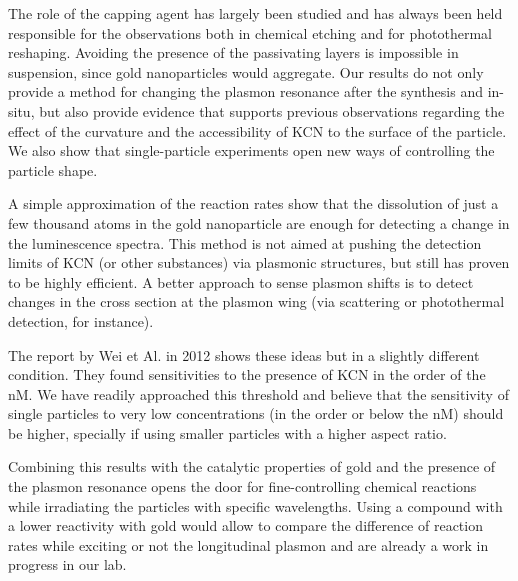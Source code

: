 \documentclass{article}
\begin{document}
The role of the capping agent has largely been studied and has always been held
responsible for the observations both in chemical etching\cite{Yuan2015} and for
photothermal reshaping\cite{Horiguchi2008}. Avoiding the presence of the
passivating layers is impossible in suspension, since gold nanoparticles would
aggregate. Our results do not only provide a method for changing the plasmon
resonance after the synthesis and in-situ, but also provide evidence that
supports previous observations regarding the effect of the curvature and the
accessibility of KCN to the surface of the particle. We also show that
single-particle experiments open new ways of controlling the particle shape.

A simple approximation of the reaction rates show that the dissolution of just a
few thousand atoms in the gold nanoparticle are enough for detecting a change in the
luminescence spectra. This method is not aimed at pushing the detection limits
of KCN (or other substances) via plasmonic structures, but still has proven to
be highly efficient. A better approach to sense plasmon shifts is to detect
changes in the cross section at the plasmon wing (via scattering or
photothermal detection, for instance). 

The report by Wei et Al. in 2012 \cite{Wei2012} shows these ideas but in a
slightly different condition. They found sensitivities to the presence of KCN in
the order of the nM. We have readily approached this threshold and believe that
the sensitivity of single particles to very low concentrations (in the order or
below the nM) should be higher, specially if using smaller particles with a
higher aspect ratio.

Combining this results with the catalytic properties of gold and the presence of
the plasmon resonance opens the door for fine-controlling chemical reactions
while irradiating the particles with specific wavelengths. Using a compound with
a lower reactivity with gold would allow to compare the difference of reaction
rates while exciting or not the longitudinal plasmon and are already a work in
progress in our lab.

{}

\end{document}
